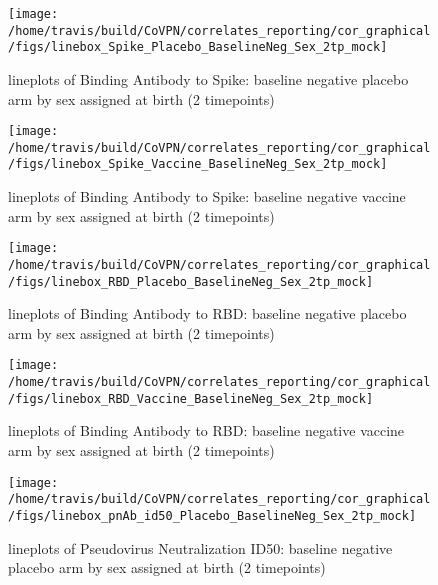 \documentclass[]{book}
\theoremstyle{definition}
\theoremstyle{definition}
\theoremstyle{definition}
\newcommand{\1}{\mathbbm{1}}
\begin{document}
\clearpage
\begin{figure}[H]

{\centering \texttt{[image: /home/travis/build/CoVPN/correlates\_reporting/cor\_graphical/figs/linebox\_Spike\_Placebo\_BaselineNeg\_Sex\_2tp\_mock]} 

}

\caption{lineplots of Binding Antibody to Spike: baseline negative placebo arm by sex assigned at birth (2 timepoints)}\label{fig:unnamed-chunk-155}
\end{figure}

\clearpage
\begin{figure}[H]

{\centering \texttt{[image: /home/travis/build/CoVPN/correlates\_reporting/cor\_graphical/figs/linebox\_Spike\_Vaccine\_BaselineNeg\_Sex\_2tp\_mock]} 

}

\caption{lineplots of Binding Antibody to Spike: baseline negative vaccine arm by sex assigned at birth (2 timepoints)}\label{fig:unnamed-chunk-156}
\end{figure}

\clearpage
\begin{figure}[H]

{\centering \texttt{[image: /home/travis/build/CoVPN/correlates\_reporting/cor\_graphical/figs/linebox\_RBD\_Placebo\_BaselineNeg\_Sex\_2tp\_mock]} 

}

\caption{lineplots of Binding Antibody to RBD: baseline negative placebo arm by sex assigned at birth (2 timepoints)}\label{fig:unnamed-chunk-157}
\end{figure}

\clearpage
\begin{figure}[H]

{\centering \texttt{[image: /home/travis/build/CoVPN/correlates\_reporting/cor\_graphical/figs/linebox\_RBD\_Vaccine\_BaselineNeg\_Sex\_2tp\_mock]} 

}

\caption{lineplots of Binding Antibody to RBD: baseline negative vaccine arm by sex assigned at birth (2 timepoints)}\label{fig:unnamed-chunk-158}
\end{figure}

\clearpage
\begin{figure}[H]

{\centering \texttt{[image: /home/travis/build/CoVPN/correlates\_reporting/cor\_graphical/figs/linebox\_pnAb\_id50\_Placebo\_BaselineNeg\_Sex\_2tp\_mock]} 

}

\caption{lineplots of Pseudovirus Neutralization ID50: baseline negative placebo arm by sex assigned at birth (2 timepoints)}\label{fig:unnamed-chunk-159}
\end{figure}
\end{document}
